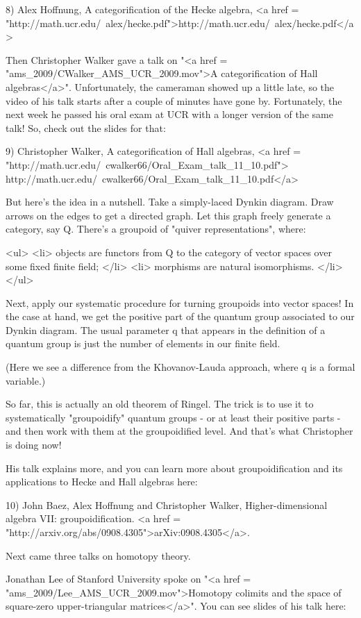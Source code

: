 8) Alex Hoffnung, A categorification of the Hecke algebra, 
<a href = "http://math.ucr.edu/~alex/hecke.pdf">http://math.ucr.edu/~alex/hecke.pdf</a>

Then Christopher Walker gave a talk on "<a href =
"ams_2009/CWalker_AMS_UCR_2009.mov">A categorification of Hall
algebras</a>".  Unfortunately, the cameraman showed up a little
late, so the video of his talk starts after a couple of minutes have
gone by.  Fortunately, the next week he passed his oral exam at UCR
with a longer version of the same talk!  So, check out the slides for
that:

9) Christopher Walker, A categorification of Hall algebras, 
<a href = "http://math.ucr.edu/~cwalker66/Oral_Exam_talk_11_10.pdf">
http://math.ucr.edu/~cwalker66/Oral_Exam_talk_11_10.pdf</a>

But here's the idea in a nutshell.  Take a simply-laced Dynkin
diagram.  Draw arrows on the edges to get a directed graph.  Let this
graph freely generate a category, say Q.  There's a groupoid of
"quiver representations", where:

<ul>
<li>
objects are functors from Q to the category of vector spaces over 
some fixed finite field;
</li>
<li>  morphisms are natural isomorphisms.
</li>
</ul>

Next, apply our systematic procedure for turning groupoids into vector
spaces!  In the case at hand, we get the positive part of the quantum
group associated to our Dynkin diagram.  The usual parameter q that
appears in the definition of a quantum group is just the number of
elements in our finite field.  

(Here we see a difference from the
Khovanov-Lauda approach, where q is a formal variable.)

So far, this is actually an old theorem of Ringel.  The trick is to
use it to systematically "groupoidify" quantum groups - or at least
their positive parts - and then work with them at the groupoidified
level.  And that's what Christopher is doing now!  

His talk explains more, and you can learn more about groupoidification
and its applications to Hecke and Hall algebras here:

10) John Baez, Alex Hoffnung and Christopher Walker, Higher-dimensional
algebra VII: groupoidification.  
<a href = "http://arxiv.org/abs/0908.4305">arXiv:0908.4305</a>.

Next came three talks on homotopy theory.  

Jonathan Lee of Stanford
University spoke on "<a href = "ams_2009/Lee_AMS_UCR_2009.mov">Homotopy colimits and the space of square-zero
upper-triangular matrices</a>".  You can see slides of his talk here:

